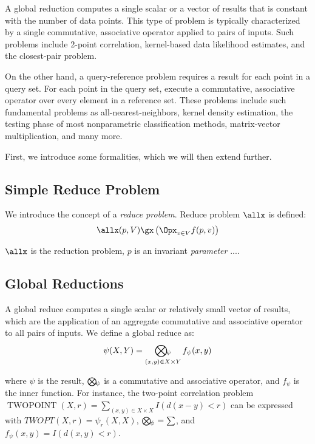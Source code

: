 \documentclass[times, 10pt,twocolumn]{article}
\DeclareMathOperator{\TWOPT}{TWOPOINT}
\newcommand{\myOp}[1]{\mathop{\bigotimes\nolimits\hspace{-0.045in}_{#1}}}
\newcommand{\allpsi}{\psi}
\newcommand{\Oppsi}{\myOp{\psi}}
\newcommand{\fpsi}{f_{\psi}}
\begin{document}
A global reduction computes a single scalar or a vector of results that is constant with the number of data points.
This type of problem is typically characterized by a single commutative, associative operator applied to pairs of inputs.
Such problems include 2-point correlation, kernel-based data likelihood estimates, and the closest-pair problem.

On the other hand, a query-reference problem requires a result for each point in a query set.
For each point in the query set, execute a commutative, associative operator over every element in a reference set.
These problems include such fundamental problems as all-nearest-neighbors, kernel density estimation, the testing phase of most nonparametric classification methods, matrix-vector multiplication, and many more.

First, we introduce some formalities, which we will then extend further.

\subsection{Simple Reduce Problem}

We introduce the concept of a \textit{reduce problem}.
Reduce problem $\allx$ is defined:
$$\allx(p, V) \gx \left( \Opx_{v \in V} f(p, v) \right)$$

\where $\allx$ is the reduction problem, $p$ is an invariant {\it parameter} ....

\subsection{Global Reductions}


A global reduce computes a single scalar or relatively small vector of results, which are the application of an aggregate commutative and associative operator to all pairs of inputs.
We define a global reduce as:
\begin{equation}
\allpsi(X, Y) = \Oppsi_{(x, y) \in X \times Y} \fpsi(x, y)
\label{eqn:defpsi}
\end{equation}

\noindent where $\allpsi$ is the result, $\Oppsi$ is a commutative and associative operator, and $\fpsi$ is the inner function.
For instance, the two-point correlation problem $\TWOPT(X, r) = \sum_{(x, y) \in X \times X} I(d(x - y) < r)$ can be expressed with $TWOPT(X, r) = \allpsi_r(X, X)$, $\Oppsi = \sum$, and $\fpsi(x, y) = I(d(x, y) < r)$.
\end{document}
